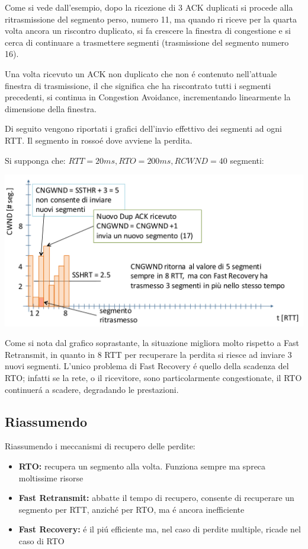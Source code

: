 \documentclass[12pt]{article}
\begin{document}
Come si vede dall'esempio, dopo la ricezione di 3 ACK duplicati si procede alla ritrasmissione del segmento perso,
numero 11, ma quando ri riceve per la quarta volta ancora un riscontro duplicato, si fa crescere la finestra di 
congestione e si cerca di continuare a trasmettere segmenti (trasmissione del segmento numero 16).

Una volta ricevuto un ACK non duplicato che non \'e contenuto nell'attuale finestra di trasmissione, il che significa 
che ha riscontrato tutti i segmenti precedenti, si continua in Congestion Avoidance, incrementando linearmente la 
dimensione della finestra.

Di seguito vengono riportati i grafici dell'invio effettivo dei segmenti ad ogni RTT. Il segmento in rosso\'e dove 
avviene la perdita.

Si supponga che: $RTT=20ms, RTO=200ms, RCWND=40$ segmenti:

\begin{center}
	\includegraphics[scale=0.35]{livello_trasporto-img17.png}
\end{center}

Come si nota dal grafico soprastante, la situazione migliora molto rispetto a Fast Retransmit, in quanto in 8 RTT per 
recuperare la perdita si riesce ad inviare 3 nuovi segmenti. L'unico problema di Fast Recovery \'e quello della 
scadenza del RTO; infatti se la rete, o il ricevitore, sono particolarmente congestionate, il RTO continuer\'a a 
scadere, degradando le prestazioni.

\subsection{Riassumendo}\label{tcp-recupero-delle-perdite-riassumendo}
Riassumendo i meccanismi di recupero delle perdite:
\begin{itemize}[noitemsep]
    \item \textbf{RTO:} recupera un segmento alla volta. Funziona sempre ma spreca moltissime risorse
    \item \textbf{Fast Retransmit:} abbatte il tempo di recupero, consente di recuperare un segmento per RTT, 
          anzich\'e per RTO, ma \'e ancora inefficiente
    \item \textbf{Fast Recovery:} \'e il pi\'u efficiente ma, nel caso di perdite multiple, ricade nel caso di RTO
\end{itemize}
\end{document}
